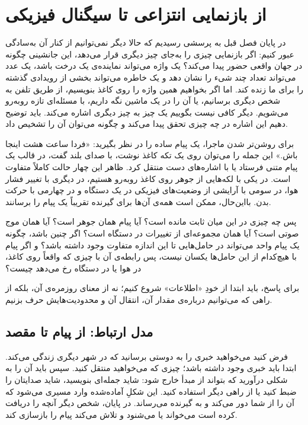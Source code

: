 \chapter{از بازنمایی انتزاعی تا سیگنال فیزیکی}
\label{ch:representation-to-physical-fa}

در پایان فصل قبل به پرسشی رسیدیم که حالا دیگر نمی‌توانیم از کنار آن به‌سادگی عبور کنیم: اگر بازنمایی چیزی را به‌جای چیز دیگری قرار می‌دهد، این جانشینی چگونه در جهان واقعی حضور پیدا می‌کند؟ یک واژه می‌تواند نماینده‌ی یک درخت باشد، یک عدد می‌تواند تعداد چند شیء را نشان دهد و یک خاطره می‌تواند بخشی از رویدادی گذشته را برای ما زنده کند. اما اگر بخواهیم همین واژه را روی کاغذ بنویسیم، از طریق تلفن به شخص دیگری برسانیم، یا آن را در یک ماشین نگه داریم، با مسئله‌ای تازه روبه‌رو می‌شویم. دیگر کافی نیست بگوییم یک چیز به چیز دیگری اشاره می‌کند. باید توضیح دهیم این اشاره در چه چیزی تحقق پیدا می‌کند و چگونه می‌توان آن را تشخیص داد.

برای روشن‌تر شدن ماجرا، یک پیام ساده را در نظر بگیرید: «فردا ساعت هشت اینجا باش.» این جمله را می‌توان روی یک تکه کاغذ نوشت، با صدای بلند گفت، در قالب یک پیام متنی فرستاد یا با اشاره‌های دست منتقل کرد. ظاهر این چهار حالت کاملاً متفاوت است. در یکی با لکه‌هایی از جوهر روی کاغذ روبه‌رو هستیم، در دیگری با تغییر فشار هوا، در سومی با آرایشی از وضعیت‌های فیزیکی در یک دستگاه و در چهارمی با حرکت بدن. بااین‌حال، ممکن است همه‌ی آن‌ها برای گیرنده تقریباً یک پیام را برسانند.

پس چه چیزی در این میان ثابت مانده است؟ آیا پیام همان جوهر است؟ آیا همان موج صوتی است؟ آیا همان مجموعه‌ای از تغییرات در دستگاه است؟ اگر چنین باشد، چگونه یک پیام واحد می‌تواند در حامل‌هایی تا این اندازه متفاوت وجود داشته باشد؟ و اگر پیام با هیچ‌کدام از این حامل‌ها یکسان نیست، پس رابطه‌ی آن با چیزی که واقعاً روی کاغذ، در هوا یا در دستگاه رخ می‌دهد چیست؟

برای پاسخ، باید ابتدا از خودِ «اطلاعات» شروع کنیم؛ نه از معنای روزمره‌ی آن، بلکه از راهی که می‌توانیم درباره‌ی مقدار آن، انتقال آن و محدودیت‌هایش حرف بزنیم.

\section{مدل ارتباط: از پیام تا مقصد}
\label{sec:communication-model}

فرض کنید می‌خواهید خبری را به دوستی برسانید که در شهر دیگری زندگی می‌کند. ابتدا باید خبری وجود داشته باشد؛ چیزی که می‌خواهید منتقل کنید. سپس باید آن را به شکلی درآورید که بتواند از مبدأ خارج شود: شاید جمله‌ای بنویسید، شاید صدایتان را ضبط کنید یا از راهی دیگر استفاده کنید. این شکلِ آماده‌شده وارد مسیری می‌شود که آن را از شما دور می‌کند و به گیرنده می‌رساند. در پایان، شخص دیگر آنچه را دریافت کرده است می‌خواند یا می‌شنود و تلاش می‌کند پیام را بازسازی کند.


